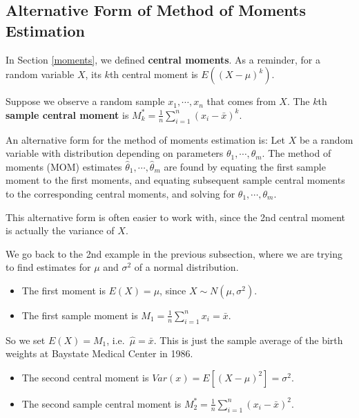 \documentclass[
]{book}
\providecommand{\tightlist}{%
  \setlength{\itemsep}{0pt}\setlength{\parskip}{0pt}}
\begin{document}
\hypertarget{alternative-form-of-method-of-moments-estimation}{%
\subsection{Alternative Form of Method of Moments Estimation}\label{alternative-form-of-method-of-moments-estimation}}

In Section \ref{moments}, we defined \textbf{central moments}. As a reminder, for a random variable \(X\), its \(k\)th central moment is \(E((X-\mu)^k)\).

Suppose we observe a random sample \(x_1, \cdots, x_n\) that comes from \(X\). The \(k\)th \textbf{sample central moment} is \(M_k^* = \frac{1}{n} \sum_{i=1}^n (x_i - \bar{x})^k\).

An alternative form for the method of moments estimation is: Let \(X\) be a random variable with distribution depending on parameters \(\theta_1, \cdots, \theta_m\). The method of moments (MOM) estimates \(\hat{\theta}_1, \cdots, \hat{\theta}_m\) are found by equating the first sample moment to the first moments, and equating subsequent sample central moments to the corresponding central moments, and solving for \(\theta_1, \cdots, \theta_m\).

This alternative form is often easier to work with, since the 2nd central moment is actually the variance of \(X\).

We go back to the 2nd example in the previous subsection, where we are trying to find estimates for \(\mu\) and \(\sigma^2\) of a normal distribution.

\begin{itemize}
\tightlist
\item
  The first moment is \(E(X) = \mu\), since \(X \sim N(\mu, \sigma^2)\).
\item
  The first sample moment is \(M_1 = \frac{1}{n} \sum_{i=1}^n x_i = \bar{x}\).
\end{itemize}

So we set \(E(X) = M_1\), i.e.~\(\hat{\mu} = \bar{x}\). This is just the sample average of the birth weights at Baystate Medical Center in 1986.

\begin{itemize}
\tightlist
\item
  The second central moment is \(Var(x) = E[(X-\mu)^2] = \sigma^2\).
\item
  The second sample central moment is \(M_2^* = \frac{1}{n} \sum_{i=1}^n (x_i - \bar{x})^2\).
\end{itemize}
\end{document}
